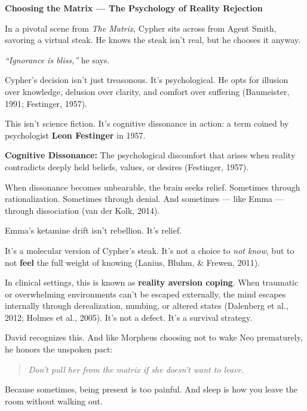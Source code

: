 \begin{PsychologicalSidebar}{\textbf{Choosing the Matrix --- The Psychology of Reality Rejection}}

    In a pivotal scene from \textit{The Matrix}, Cypher sits across from Agent Smith, savoring 
    a virtual steak.  
    He knows the steak isn’t real, but he chooses it anyway.

    \medskip
    
    \textit{“Ignorance is bliss,”} he says.

    \medskip
    
    Cypher’s decision isn’t just treasonous. It’s psychological.  
    He opts for illusion over knowledge, delusion over clarity, and comfort over suffering 
    (Baumeister, 1991; Festinger, 1957).

    \medskip
    
    This isn’t science fiction.  
    It’s cognitive dissonance in action: a term coined by psychologist \textbf{Leon Festinger} 
    in 1957.

    \medskip
    
    \textbf{Cognitive Dissonance:}  
    The psychological discomfort that arises when reality contradicts deeply held beliefs, values, 
    or desires (Festinger, 1957).

    \medskip
    
    When dissonance becomes unbearable, the brain seeks relief.  
    Sometimes through rationalization.  
    Sometimes through denial.  
    And sometimes --- like Emma --- through dissociation (van der Kolk, 2014).

    \medskip
    
    Emma’s ketamine drift isn’t rebellion.  
    It’s relief.

    \medskip
    
    It's a molecular version of Cypher’s steak.  
    It's not a choice to \textit{not know}, but to not \textbf{feel} the full weight 
    of knowing (Lanius, Bluhm, \& Frewen, 2011).

    \medskip
    
    In clinical settings, this is known as \textbf{reality aversion coping}.  
    When traumatic or overwhelming environments can’t be escaped externally, the mind 
    escapes internally through derealization, numbing, or altered states 
    (Dalenberg et al., 2012; Holmes et al., 2005).  
    It’s not a defect. It’s a survival strategy.

    \medskip
    
    David recognizes this.  
    And like Morpheus choosing not to wake Neo prematurely,  
    he honors the unspoken pact:  
    
    \begin{quote}
    \textit{Don’t pull her from the matrix  
    if she doesn’t want to leave.}
    \end{quote}

    Because sometimes, being present is too painful.  
    And sleep is how you leave the room without walking out.

\end{PsychologicalSidebar}

